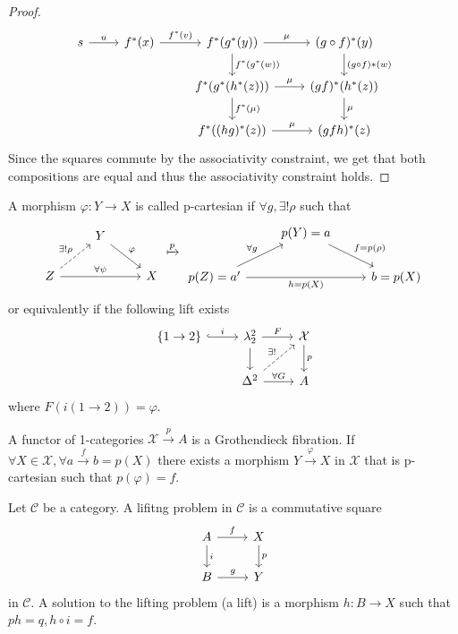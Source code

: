 \begin{proof}
	\[
	\begin{tikzcd}
		s 
		\ar[r, " u "]
		&
		f^* ( x ) 
		\ar[r, " f^* ( v ) "]
		&
		f^* ( g^* ( y ) )
		\ar[r," \mu "]
		\ar[d," f^* ( g^* ( w )) "]
		&
		( g \circ f )^* ( y ) 
		\ar[d, " { ( g \circ f )*(w) } "]
		\\
		&&
		f^* ( g^* ( h^* ( z )))
		\ar[r, " \mu "]
		\ar[d," f^* ( \mu ) "]
		&
		( gf )^* (h^* ( z ))
		\ar[d, " \mu "]
		\\
		&&
		f^* (( h g )^*( z ) )
		\ar[r, "\mu"]
		&
		( g f h )^* ( z ) 
	\end{tikzcd}
	\]
	Since the squares commute by the associativity constraint, we get that both compositions are equal and thus the associativity constraint holds.
\end{proof}

\begin{defi}
\label{p-cartesian_defi}
	A morphism $ \varphi \colon Y \to X $ is called p-cartesian if $ \forall g ,  \exists! \rho $ such that 
	\[
	\begin{tikzcd}
		&
		Y
		\ar[rd, " \varphi " ]
		\\
		Z
		\ar[ru, dashed, " \exists! \rho "]
		\ar[rr, " \forall \psi" ]
		&&
		X
	\end{tikzcd}
	\xmapsto{ p }
	\begin{tikzcd}
		&
		p ( Y ) = a 
		\ar[rd, " f = p ( \rho ) " ]
		\\
		p ( Z ) = a'
		\ar[ru, " \forall g "]
		\ar[rr, " h = p ( X ) "' ]
		&&
		b = p ( X ) 
	\end{tikzcd}
	\]
	or equivalently if the following lift exists
	\[
	\begin{tikzcd}	
		\{ 1 \to 2 \}
		\ar[r, hook, " i " ]
		&
		\lambda^2_2
		\ar[r, " F "]
		\ar[d]
		&
		\mathcal{ X }
		\ar[d, " p "]
		\\
		&
		\Delta^2
		\ar[ru, dashed, "\exists ! "]
		\ar[r, " \forall G "]
		&
		A
	\end{tikzcd}
	\]
	where $ F ( i ( 1 \to 2 ) ) = \varphi $.
\end{defi}

\begin{defi}
	A functor of 1-categories $ \mathcal{ X } \xrightarrow{ p } A $ is a Grothendieck fibration.
	If $ \forall X \in \mathcal{ X } , \forall a \xrightarrow{ f } b = p ( X ) $ there exists a morphism $ Y \xrightarrow{ \varphi } X $ in $ \mathcal{ X } $ that is p-cartesian such that $ p ( \varphi ) = f $.
\end{defi}

\begin{defi}
	Let $ \mathcal{ C } $ be a category. 
	A lifitng problem in $ \mathcal{ C } $ is a commutative square 
	\[
	\begin{tikzcd}
		A
		\ar[r, "f"]
		\ar[d, "i"]
		&
		X 
		\ar[d, "p"]
		\\
		B
		\ar[r, "g"]
		&
		Y
	\end{tikzcd}	
	\]
	in $ \mathcal{ C } $. 
	A solution to the lifting problem (a lift) is a morphism $ h \colon B \to X $ such that $ ph = q, h \circ i = f $.
\end{defi}

